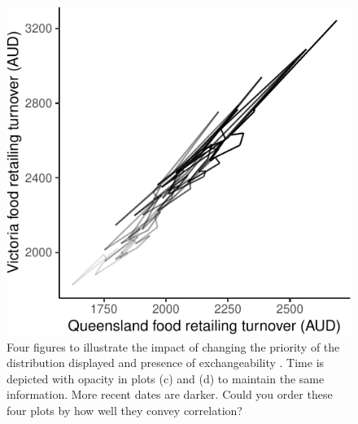 \documentclass[
  letterpaper,
  DIV=11,
  numbers=noendperiod]{scrartcl}
\begin{document}
\begin{figure}
\begin{minipage}[t]{0.50\linewidth}
{{\includegraphics{confirmationreport_files/figure-pdf/fig-timescatter-4.pdf}

}

}

\end{minipage}%

\caption{\label{fig-timescatter}Four figures to illustrate the impact of
changing the priority of the distribution displayed and presence of
exchangeability . Time is depicted with opacity in plots (c) and (d) to
maintain the same information. More recent dates are darker. Could you
order these four plots by how well they convey correlation?}

\end{figure}
\end{document}
